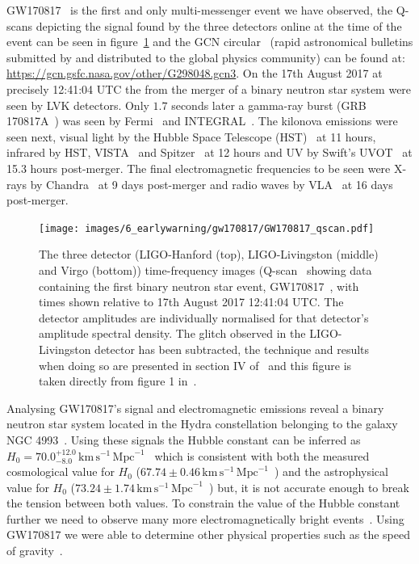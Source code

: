 GW170817~\cite{GW170817:2017} is the first and only multi-messenger event we have observed, the Q-scans depicting the \gwadj signal found by the three detectors online at the time of the event can be seen in figure~\ref{6:fig:gw170817_qscan} and the GCN circular~\cite{gcn_circulars:2024} (rapid astronomical bulletins submitted by and distributed to the global physics community) can be found at: \href{https://gcn.gsfc.nasa.gov/other/G298048.gcn3}{https://gcn.gsfc.nasa.gov/other/G298048.gcn3}. On the 17th August 2017 at precisely 12:41:04 UTC the \gws from the merger of a binary neutron star system were seen by LVK detectors. Only $1.7$ seconds later a gamma-ray burst (GRB 170817A~\cite{gw170817_joint:2017}) was seen by Fermi~\cite{Fermi:2022, Fermi_GW170817:2017} and INTEGRAL~\cite{INTEGRAL:2003, INTEGRAL_GW170817:2017}. The kilonova emissions were seen next, visual light by the Hubble Space Telescope (HST)~\cite{HST:2000, HST_GW170817:2021} at 11 hours, infrared by HST, VISTA~\cite{VISTA:2015, VISTA_GW170817:2017} and Spitzer~\cite{Spitzer:2004, Spitzer_GW170817:2018} at 12 hours and UV by Swift's UVOT~\cite{Swift:2004, Swift_GW170817:2017} at 15.3 hours post-merger. The final electromagnetic frequencies to be seen were X-rays by Chandra~\cite{Chandra_GW170817:2017} at 9 days post-merger and radio waves by VLA~\cite{VLA:2019, VLA_GW170817:2017} at 16 days post-merger.
%
\begin{figure}
    \centering
    \texttt{[image: images/6\_earlywarning/gw170817/GW170817\_qscan.pdf]}
    \caption{The three detector (LIGO-Hanford (top), LIGO-Livingston (middle) and Virgo (bottom)) time-frequency images (Q-scan~\cite{qscan:2004} showing data containing the first binary neutron star \gwadj event, GW170817~\cite{GW170817:2017}, with times shown relative to 17th August 2017 12:41:04 UTC. The detector amplitudes are individually normalised for that detector's amplitude spectral density. The glitch observed in the LIGO-Livingston detector has been subtracted, the technique and results when doing so are presented in section IV of~\cite{GW170817:2017} and this figure is taken directly from figure 1 in~\cite{GW170817:2017}.}
    \label{6:fig:gw170817_qscan}
\end{figure}
%

Analysing GW170817's \gwadj signal and electromagnetic emissions reveal a binary neutron star system located in the Hydra constellation belonging to the galaxy NGC 4993~\cite{NGC4993:1998}. Using these signals the Hubble constant can be inferred as $H_0 = 70.0^{+12.0}_{-8.0} \, \text{km} \, \text{s}^{-1} \,\text{Mpc}^{-1}$~\cite{GW170817_H0:2017} which is consistent with both the measured cosmological value for $H_0$ ($67.74 \pm0.46 \, \text{km} \, \text{s}^{-1} \,\text{Mpc}^{-1}$~\cite{Planck_H0:2015}) and the astrophysical value for $H_0$ ($73.24 \pm1.74 \, \text{km} \, \text{s}^{-1} \,\text{Mpc}^{-1}$~\cite{Riess_H0:2016}) but, it is not accurate enough to break the tension between both values. To constrain the value of the Hubble constant further we need to observe many more electromagnetically bright events~\cite{Palmese:2021}. Using GW170817 we were able to determine other physical properties such as the speed of gravity~\cite{Harry_speed_of_gravity:2022, Baker_speed_of_gravity:2022}.

